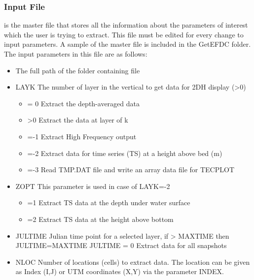\documentclass[letterpaper,10pt,english]{sphinxmanual}
\begin{document}
\subsubsection{Input File}
\label{\detokenize{outputfiles/getefdc:input-file}}
 is the master file that stores all the information about the parameters of
interest which the user is trying to extract. This file must be edited for every change to input
parameters. A sample of the master file is included in the GetEFDC folder. The input
parameters in this file are as follows:
\begin{itemize}
\item {} 
The full path of the folder containing  file

\item {} 
LAYK The number of layer in the vertical to get data for 2DH display (\textgreater{}0)
\begin{itemize}
\item {} 
= 0 Extract the depth-averaged data

\item {} 
\textgreater{}0 Extract the data at layer of k

\item {} 
=-1 Extract High Frequency output

\item {} 
=-2 Extract data for time series (TS) at a height above bed (m)

\item {} 
=-3 Read TMP.DAT file and write an array data file for TECPLOT

\end{itemize}

\item {} 
ZOPT This parameter is used in case of LAYK=-2
\begin{itemize}
\item {} 
=1 Extract TS data at the depth under water surface

\item {} 
=2 Extract TS data at the height above bottom

\end{itemize}

\item {} 
JULTIME Julian time point for a selected layer, if \textgreater{} MAXTIME then JULTIME=MAXTIME
JULTIME = 0 Extract data for all snapshots

\item {} 
NLOC Number of locations (cells) to extract data. The location can be given
as Index (I,J) or UTM coordinates (X,Y) via the parameter INDEX.


\end{itemize}
\end{document}
